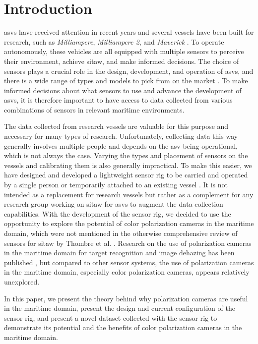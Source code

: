 \section{Introduction}
\glspl{asv} have received attention in recent years and several vessels have been built for research, such as \textit{Milliampere}, \textit{Milliampere 2}, and \textit{Maverick} \cite{brekkeMilliAmpereAutonomousFerry2022,zhangDesignBuildAutonomous2023,eideAutonomousUrbanPassengerInReview}.
To operate autonomously, these vehicles are all equipped with multiple sensors to perceive their environment, achieve \gls{sitaw}, and make informed decisions.
The choice of sensors plays a crucial role in the design, development, and operation of \glspl{asv}, and there is a wide range of types and models to pick from on the market \cite{thombreSensorsAITechniques2022}.
To make informed decisions about what sensors to use and advance the development of \glspl{asv}, it is therefore important to have access to data collected from various combinations of sensors in relevant maritime environments.

The data collected from research vessels are valuable for this purpose and necessary for many types of research.
Unfortunately, collecting data this way generally involves multiple people and depends on the \gls{asv} being operational, which is not always the case.
Varying the types and placement of sensors on the vessels and calibrating them is also generally impractical.
To make this easier, we have designed and developed a lightweight sensor rig to be carried and operated by a single person or temporarily attached to an existing vessel \cite{martensPavingWayEnhanced2023}.
It is not intended as a replacement for research vessels but rather as a complement for any research group working on \gls{sitaw} for \glspl{asv} to augment the data collection capabilities.
With the development of the sensor rig, we decided to use the opportunity to explore the potential of color polarization cameras in the maritime domain, which were not mentioned in the otherwise comprehensive review of sensors for \gls{sitaw} by Thombre et al. \cite{thombreSensorsAITechniques2022}.
Research on the use of polarization cameras in the maritime domain for target recognition and image dehazing has been published \cite{zhongPolarizationintensityJointImaging2023,maPolarizationBasedMethodMaritime2024}, but compared to other sensor systems, the use of polarization cameras in the maritime domain, especially color polarization cameras, appears relatively unexplored.

In this paper, we present the theory behind why polarization cameras are useful in the maritime domain, present the design and current configuration of the sensor rig, and present a novel dataset collected with the sensor rig to demonstrate its potential and the benefits of color polarization cameras in the maritime domain.

